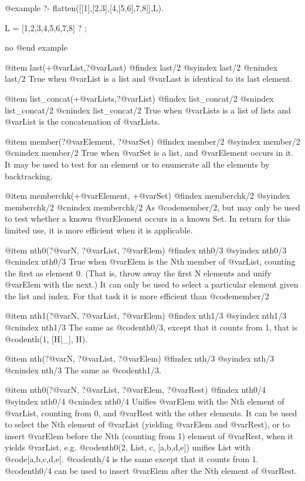 {{{{{{{{{@example
?- flatten([[1],[2,3],[4,[5,6],7,8]],L).

L = [1,2,3,4,5,6,7,8] ? ;

no
@end example

@item last(+@var{List},?@var{Last})
@findex last/2
@syindex last/2
@cnindex last/2
True when @var{List} is a list and @var{Last} is identical to its last element.

@item list_concat(+@var{Lists},?@var{List})
@findex list_concat/2
@snindex list_concat/2
@cnindex list_concat/2
True when @var{Lists} is a list of lists and @var{List} is the
concatenation of @var{Lists}.

@item member(?@var{Element}, ?@var{Set})
@findex member/2
@syindex member/2
@cnindex member/2
True when @var{Set} is a list, and @var{Element} occurs in it.  It may be used
to test for an element or to enumerate all the elements by backtracking.

@item memberchk(+@var{Element}, +@var{Set})
@findex memberchk/2
@syindex memberchk/2
@cnindex memberchk/2
As @code{member/2}, but may only be used to test whether a known
@var{Element} occurs in a known Set.  In return for this limited use, it
is more efficient when it is applicable.

@item nth0(?@var{N}, ?@var{List}, ?@var{Elem})
@findex nth0/3
@syindex nth0/3
@cnindex nth0/3
True when @var{Elem} is the Nth member of @var{List},
counting the first as element 0.  (That is, throw away the first
N elements and unify @var{Elem} with the next.)  It can only be used to
select a particular element given the list and index.  For that
task it is more efficient than @code{member/2}

@item nth1(?@var{N}, ?@var{List}, ?@var{Elem})
@findex nth1/3
@syindex nth1/3
@cnindex nth1/3
The same as @code{nth0/3}, except that it counts from
1, that is @code{nth(1, [H|_], H)}.

@item nth(?@var{N}, ?@var{List}, ?@var{Elem})
@findex nth/3
@syindex nth/3
@cnindex nth/3
The same as @code{nth1/3}.

@item nth0(?@var{N}, ?@var{List}, ?@var{Elem}, ?@var{Rest})
@findex nth0/4
@syindex nth0/4
@cnindex nth0/4
Unifies @var{Elem} with the Nth element of @var{List},
counting from 0, and @var{Rest} with the other elements.  It can be used
to select the Nth element of @var{List} (yielding @var{Elem} and @var{Rest}), or to
insert @var{Elem} before the Nth (counting from 1) element of @var{Rest}, when
it yields @var{List}, e.g. @code{nth0(2, List, c, [a,b,d,e])} unifies List with
@code{[a,b,c,d,e]}.  @code{nth/4} is the same except that it counts from 1.  @code{nth0/4}
can be used to insert @var{Elem} after the Nth element of @var{Rest}.

}}}}}}}}}
